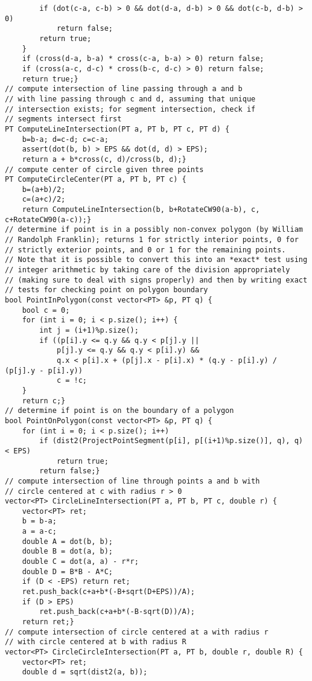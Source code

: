\documentclass[8pt, oneside]{extarticle}
\begin{document}
\begin{multicols}{3}
\begin{lstlisting}
        if (dot(c-a, c-b) > 0 && dot(d-a, d-b) > 0 && dot(c-b, d-b) > 0)
            return false;
        return true;
    }
    if (cross(d-a, b-a) * cross(c-a, b-a) > 0) return false;
    if (cross(a-c, d-c) * cross(b-c, d-c) > 0) return false;
    return true;}
// compute intersection of line passing through a and b
// with line passing through c and d, assuming that unique
// intersection exists; for segment intersection, check if
// segments intersect first
PT ComputeLineIntersection(PT a, PT b, PT c, PT d) {
    b=b-a; d=c-d; c=c-a;
    assert(dot(b, b) > EPS && dot(d, d) > EPS);
    return a + b*cross(c, d)/cross(b, d);}
// compute center of circle given three points
PT ComputeCircleCenter(PT a, PT b, PT c) {
    b=(a+b)/2;
    c=(a+c)/2;
    return ComputeLineIntersection(b, b+RotateCW90(a-b), c, c+RotateCW90(a-c));}
// determine if point is in a possibly non-convex polygon (by William
// Randolph Franklin); returns 1 for strictly interior points, 0 for
// strictly exterior points, and 0 or 1 for the remaining points.
// Note that it is possible to convert this into an *exact* test using
// integer arithmetic by taking care of the division appropriately
// (making sure to deal with signs properly) and then by writing exact
// tests for checking point on polygon boundary
bool PointInPolygon(const vector<PT> &p, PT q) {
    bool c = 0;
    for (int i = 0; i < p.size(); i++) {
        int j = (i+1)%p.size();
        if ((p[i].y <= q.y && q.y < p[j].y || 
            p[j].y <= q.y && q.y < p[i].y) &&
            q.x < p[i].x + (p[j].x - p[i].x) * (q.y - p[i].y) / (p[j].y - p[i].y))
            c = !c;
    }
    return c;}
// determine if point is on the boundary of a polygon
bool PointOnPolygon(const vector<PT> &p, PT q) {
    for (int i = 0; i < p.size(); i++)
        if (dist2(ProjectPointSegment(p[i], p[(i+1)%p.size()], q), q) < EPS)
            return true;
        return false;}
// compute intersection of line through points a and b with
// circle centered at c with radius r > 0
vector<PT> CircleLineIntersection(PT a, PT b, PT c, double r) {
    vector<PT> ret;
    b = b-a;
    a = a-c;
    double A = dot(b, b);
    double B = dot(a, b);
    double C = dot(a, a) - r*r;
    double D = B*B - A*C;
    if (D < -EPS) return ret;
    ret.push_back(c+a+b*(-B+sqrt(D+EPS))/A);
    if (D > EPS)
        ret.push_back(c+a+b*(-B-sqrt(D))/A);
    return ret;}
// compute intersection of circle centered at a with radius r
// with circle centered at b with radius R
vector<PT> CircleCircleIntersection(PT a, PT b, double r, double R) {
    vector<PT> ret;
    double d = sqrt(dist2(a, b));

\end{lstlisting}
\end{multicols}
\end{document}
